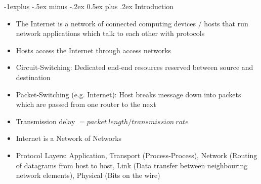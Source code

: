 \documentclass[10pt, landscape]{article}
\makeatletter
\renewcommand{\section}{\@startsection{section}{1}{0mm}%
                                {-1ex plus -.5ex minus -.2ex}%
                                {0.5ex plus .2ex}%
                                {\normalfont\large\bfseries}}
\renewcommand{\section}{\@startsection{section}{2}{0mm}%
                                {-1explus -.5ex minus -.2ex}%
                                {0.5ex plus .2ex}%
                                {\normalfont\normalsize\bfseries}}
\makeatother
\begin{document}
\raggedright
\footnotesize
\begin{multicols*}{3}

\setlength{\columnseprule}{0.25pt}
\setlength{\premulticols}{1pt}
\setlength{\postmulticols}{1pt}
\setlength{\multicolsep}{1pt}
\setlength{\columnsep}{2pt}

\begin{center}
\end{center}

\section{Introduction}
\begin{itemize}
    \item The Internet is a network of connected computing devices / hosts that run network applications which talk to each other with protocols
    \item Hosts access the Internet through access networks
    \item Circuit-Switching: Dedicated end-end resources reserved between source and destination
    \item Packet-Switching (e.g. Internet): Host breaks message down into packets which are passed from one router to the next
    \item Transmission delay $=packet \ length/transmission\ rate$
    \item Internet is a Network of Networks
    \item Protocol Layers: Application, Transport (Process-Process), Network (Routing of datagrams from host to host, Link (Data transfer between neighbouring network elements), Physical (Bits on the wire)
\end{itemize}


\end{multicols*}
\end{document}
